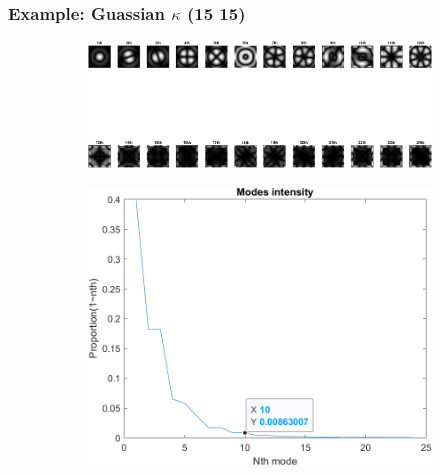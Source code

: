 \documentclass[UTF8]{beamer}
\begin{document}
\begin{frame} \frametitle{Example: Guassian $\kappa$ (15 15)}
\begin{figure}[H]
\centering
\begin{subfigure}{1\textwidth}
    \centering
    \includegraphics[width=0.9\linewidth]{../figures/ex_gu15_15.png}  
    \label{fig:modes_u}
 \end{subfigure}
 \begin{subfigure}{1\textwidth}
    \centering
    \includegraphics[width=.5\linewidth]{../figures/ex_gu15_15_s.png}  
    \label{fig:modes_u_phaze}
 \end{subfigure}
 
    \label{fig:modes_images}

 \end{figure}
\end{frame}
\end{document}

